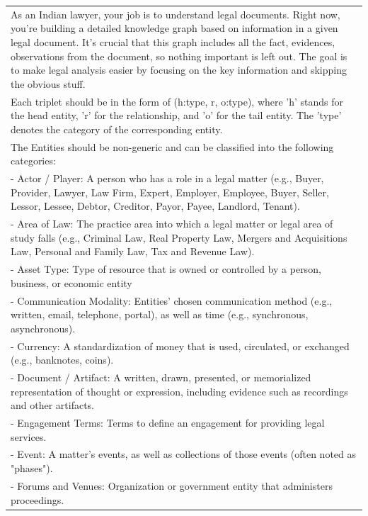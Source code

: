 \begin{table}
    \centering
    \begin{tabular}{|p{}|}
    \hline
        As an Indian lawyer, your job is to understand legal documents. Right now, you're building a detailed knowledge graph based on information in a given legal document. 
It's crucial that this graph includes all the fact, evidences, observations  from the document, so nothing important is left out.
The goal is to make legal analysis easier by focusing on the key information and skipping the obvious stuff.
        \\
        Each triplet should be in the form of (h:type, r, o:type), where 'h' stands for the head entity,
'r' for the relationship, and 'o' for the tail entity. The 'type' denotes the category of the corresponding entity.
        \\
        The Entities should be non-generic and can be classified into the following categories:
        \\
        - Actor / Player: A person who has a role in a legal matter (e.g., Buyer, Provider, Lawyer, Law Firm, Expert, Employer, Employee, Buyer, Seller, Lessor, Lessee, Debtor, Creditor, Payor, Payee, Landlord, Tenant).
\\
- Area of Law: The practice area into which a legal matter or legal area of study falls (e.g., Criminal Law, Real Property Law, Mergers and Acquisitions Law, Personal and Family Law, Tax and Revenue Law).
\\
- Asset Type: Type of resource that is owned or controlled by a person, business, or economic entity
\\
- Communication Modality: Entities' chosen communication method (e.g., written, email, telephone, portal), as well as time (e.g., synchronous, asynchronous).
\\
- Currency: A standardization of money that is used, circulated, or exchanged (e.g., banknotes, coins).
\\
- Document / Artifact: A written, drawn, presented, or memorialized representation of thought or expression, including evidence such as recordings and other artifacts.
\\
- Engagement Terms: Terms to define an engagement for providing legal services.
\\
- Event: A matter's events, as well as collections of those events (often noted as "phases").
\\
- Forums and Venues: Organization or government entity that administers proceedings.

\end{tabular}
\end{table}
